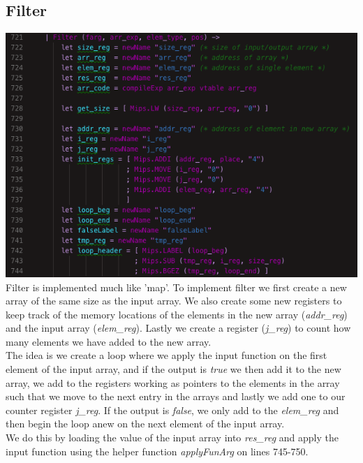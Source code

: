 \subsection{Filter}
\includegraphics[width=\linewidth]{Materials/CodeGen/filterIntro}
Filter is implemented much like 'map'. To implement filter we first create a new array of the same size as the input array. We also create some new registers to keep track of the memory locations of the elements in the new array (\textit{addr\_reg}) and the input array (\textit{elem\_reg}). Lastly we create a register (\textit{j\_reg}) to count how many elements we have added to the new array.\\
The idea is we create a loop where we apply the input function on the first element of the input array, and if the output is \textit{true} we then add it to the new array, we add to the registers working as pointers to the elements in the array such that we move to the next entry in the arrays and lastly we add one to our counter register \textit{j\_reg}. If the output is \textit{false}, we only add to the \textit{elem\_reg} and then begin the loop anew on the next element of the input array.\\
We do this by loading the value of the input array into \textit{res\_reg} and apply the input function using the helper function \textit{applyFunArg} on lines 745-750.
 
